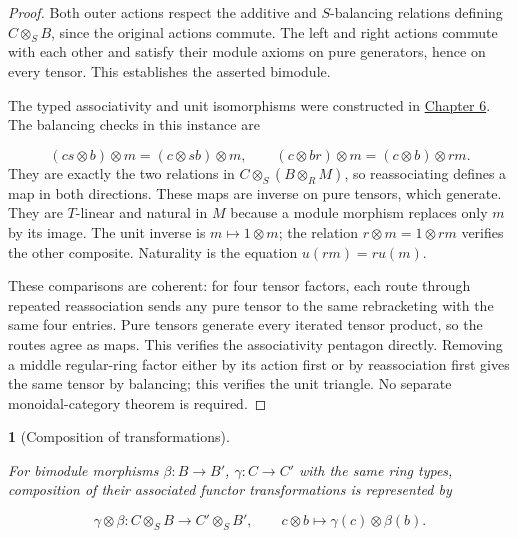 \documentclass[11pt,a4paper]{article}
\newcommand{\mathheading}{}
\theoremstyle{plain}
\newtheorem*{plainstatement}{\mathheading}
\theoremstyle{definition}
\newenvironment{mathstatement}[3]{\renewcommand{\mathheading}{#1 #2}\begin{plainstatement}[#3]}{\end{plainstatement}}
\begin{document}
\begin{proof}

Both outer actions respect the additive and \(S\)-balancing relations defining \(C\otimes_SB\), since the original actions commute. The left and right actions commute with each other and satisfy their module axioms on pure generators, hence on every tensor. This establishes the asserted bimodule.

 
The typed associativity and unit isomorphisms were constructed in \hyperref[env-6-5]{\hyperref[chapter-06]{Chapter 6}}. The balancing checks in this instance are

 \[(cs\otimes b)\otimes m=(c\otimes sb)\otimes m,\qquad(c\otimes br)\otimes m=(c\otimes b)\otimes rm.\] 
They are exactly the two relations in \(C\otimes_S(B\otimes_RM)\), so reassociating defines a map in both directions. These maps are inverse on pure tensors, which generate. They are \(T\)-linear and natural in \(M\) because a module morphism replaces only \(m\) by its image. The unit inverse is \(m\mapsto1\otimes m\); the relation \(r\otimes m=1\otimes rm\) verifies the other composite. Naturality is the equation \(u(rm)=ru(m)\).

 
These comparisons are coherent: for four tensor factors, each route through repeated reassociation sends any pure tensor to the same rebracketing with the same four entries. Pure tensors generate every iterated tensor product, so the routes agree as maps. This verifies the associativity pentagon directly. Removing a middle regular-ring factor either by its action first or by reassociation first gives the same tensor by balancing; this verifies the unit triangle. No separate monoidal-category theorem is required.


\end{proof}
 
\begin{mathstatement}{Proposition}{10.2}{Composition of transformations}
\label{env-10-2}

For bimodule morphisms \(\beta:B\to B'\), \(\gamma:C\to C'\) with the same ring types, composition of their associated functor transformations is represented by

 \[\gamma\otimes\beta:C\otimes_SB\to C'\otimes_SB',\qquad c\otimes b\longmapsto\gamma(c)\otimes\beta(b).\]
\par{}\par

\end{mathstatement}
 
\end{document}
